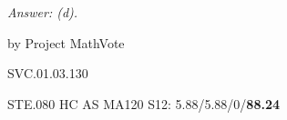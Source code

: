 {\it Answer:  (d).}

\medskip
by Project MathVote

SVC.01.03.130

STE.080
HC AS MA120 S12: 5.88/5.88/0/{\bf88.24}  \\
